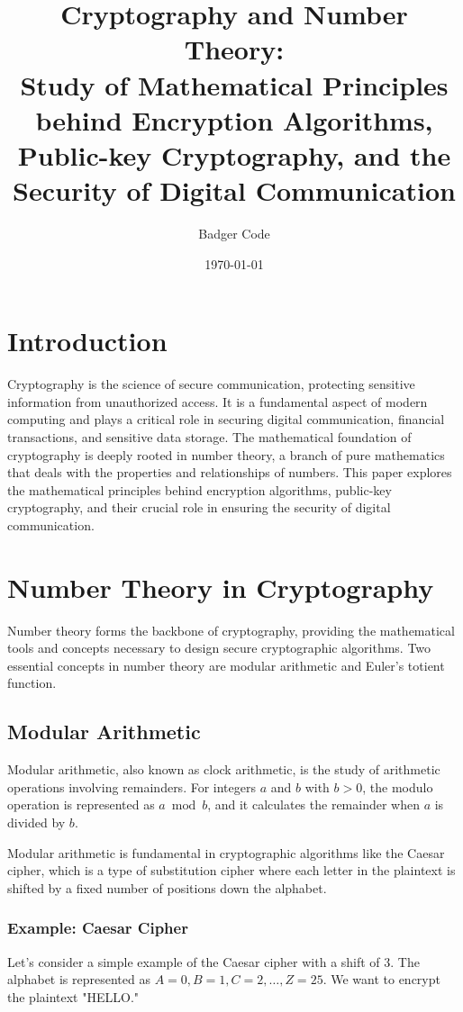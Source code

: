 \documentclass{article}
\title{Cryptography and Number Theory: \\
       Study of Mathematical Principles behind Encryption Algorithms, \\
       Public-key Cryptography, and the Security of Digital Communication}
\author{Badger Code}
\date{\today}
\begin{document}
\maketitle

\section{Introduction}
Cryptography is the science of secure communication, protecting sensitive information from unauthorized access. It is a fundamental aspect of modern computing and plays a critical role in securing digital communication, financial transactions, and sensitive data storage. The mathematical foundation of cryptography is deeply rooted in number theory, a branch of pure mathematics that deals with the properties and relationships of numbers. This paper explores the mathematical principles behind encryption algorithms, public-key cryptography, and their crucial role in ensuring the security of digital communication.

\section{Number Theory in Cryptography}
Number theory forms the backbone of cryptography, providing the mathematical tools and concepts necessary to design secure cryptographic algorithms. Two essential concepts in number theory are modular arithmetic and Euler's totient function.

\subsection{Modular Arithmetic}
Modular arithmetic, also known as clock arithmetic, is the study of arithmetic operations involving remainders. For integers $a$ and $b$ with $b > 0$, the modulo operation is represented as $a \bmod b$, and it calculates the remainder when $a$ is divided by $b$.

Modular arithmetic is fundamental in cryptographic algorithms like the Caesar cipher, which is a type of substitution cipher where each letter in the plaintext is shifted by a fixed number of positions down the alphabet.

\subsubsection{Example: Caesar Cipher}
Let's consider a simple example of the Caesar cipher with a shift of 3. The alphabet is represented as $A=0, B=1, C=2, \ldots, Z=25$. We want to encrypt the plaintext "HELLO."
\end{document}
